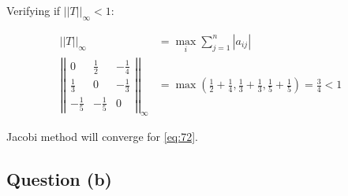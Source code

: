 		Verifying if $||T||_{\infty} < 1$:

		\begin{align}
			||T||_{\infty} &= \max_{i} \sum_{j=1}^{n}|a_{ij}|& \\
		\left|\left|
			\begin{matrix}
				0 & \frac{1}{2} & -\frac{1}{4} \\
				\frac{1}{3} & 0 & -\frac{1}{3} \\
				-\frac{1}{5} & -\frac{1}{5} & 0
			\end{matrix}
		\right|\right|_{\infty}
		&= \max \left(\frac{1}{2}+\frac{1}{4},\frac{1}{3}+\frac{1}{3}, \frac{1}{5}+\frac{1}{5}\right) = \frac{3}{4} < 1&
		\end{align}

		Jacobi method will converge for \cref{eq:72}.

	\subsection{Question (b)}


